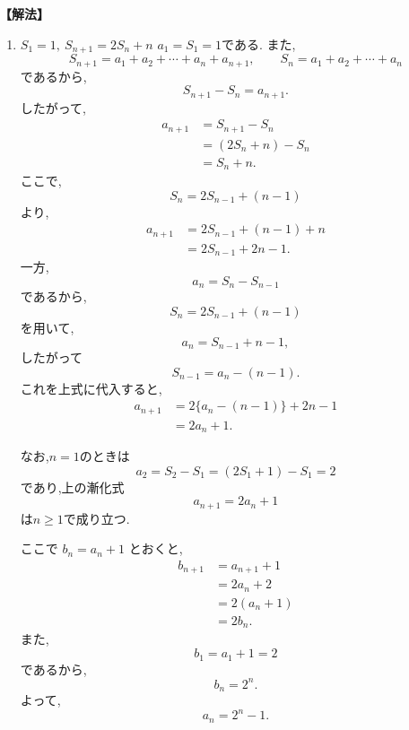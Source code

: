 \documentclass[dvipdfmx,a4paper,11pt,fleqn,openany]{jsbook}
\begin{document}
      \noindent\textbf{【解法】}
      \begin{enumerate}[label=(\arabic*),parsep=3pt]
      \item $\displaystyle S_1=1,\ S_{n+1}=2S_n+n$
          $a_1=S_1=1$である.
          また,
          \[
            S_{n+1}=a_1+a_2+\cdots+a_n+a_{n+1},
            \qquad
            S_n=a_1+a_2+\cdots+a_n
          \]
          であるから,
          \[
            S_{n+1}-S_n=a_{n+1}.
          \]
          したがって,
          \begin{align*}
            a_{n+1}
              &=S_{n+1}-S_n\\
              &=(2S_n+n)-S_n\\
              &=S_n+n.
          \end{align*}
          ここで,
          \[
            S_n=2S_{n-1}+(n-1)
          \]
          より,
          \begin{align*}
            a_{n+1}
              &=2S_{n-1}+(n-1)+n\\
              &=2S_{n-1}+2n-1.
          \end{align*}
          一方,
          \[
            a_n=S_n-S_{n-1}
          \]
          であるから,
          \[
            S_n=2S_{n-1}+(n-1)
          \]
          を用いて,
          \[
            a_n=S_{n-1}+n-1,
          \]
          したがって
          \[
            S_{n-1}=a_n-(n-1).
          \]
          これを上式に代入すると,
          \begin{align*}
            a_{n+1}
              &=2\{a_n-(n-1)\}+2n-1\\
              &=2a_n+1.
          \end{align*}

          なお,$n=1$のときは
          \[
            a_2=S_2-S_1=(2S_1+1)-S_1=2
          \]
          であり,上の漸化式
          \[
            a_{n+1}=2a_n+1
          \]
          は$n\ge1$で成り立つ.

          ここで $b_n=a_n+1$ とおくと,
          \begin{align*}
            b_{n+1}
              &=a_{n+1}+1\\
              &=2a_n+2\\
              &=2(a_n+1)\\
              &=2b_n.
          \end{align*}
          また,
          \[
            b_1=a_1+1=2
          \]
          であるから,
          \[
            b_n=2^n.
          \]
          よって,
          \[
            a_n=2^n-1.
          \]
      \end{enumerate}
\end{document}
